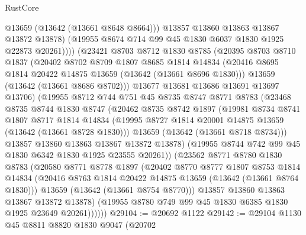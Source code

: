 \begin{lexlean}{RustCore}
\begin{coremodule}
                  @13659
                  (@13642 (@13661 @8648 @8664)))
                @13857
                @13860
                @13863
                @13867
                @13872
                @13878)
              (@19955 @8674 @714 @99 @45 @1830 @6037 @1830 @1925 @22873 @20261))))
        (@23421
          @8703
          @8712
          @1830
          @8785
          (@20395
            @8703
            @8710
            @1837
            (@20402
              @8702
              @8709
              @1807
              @8685
              @1814
              @14834
              (@20416 @8695 @1814 @20422 @14875 @13659 (@13642 (@13661 @8696 @1830)))
              @13659
              (@13642 (@13661 @8686 @8702)))
            @13677
            @13681
            @13686
            @13691
            @13697
            @13706)
          (@19955
            @8712
            @744
            @751
            @45
            @8735
            @8747
            @8771
            @8783
            (@23468
              @8735
              @8744
              @1830
              @8747
              (@20462
                @8735
                @8742
                @1897
                (@19981
                  @8734
                  @8741
                  @1807
                  @8717
                  @1814
                  @14834
                  (@19995 @8727 @1814 @20001 @14875 @13659 (@13642 (@13661 @8728 @1830)))
                  @13659
                  (@13642 (@13661 @8718 @8734)))
                @13857
                @13860
                @13863
                @13867
                @13872
                @13878)
              (@19955 @8744 @742 @99 @45 @1830 @6342 @1830 @1925 @23555 @20261))
            (@23562
              @8771
              @8780
              @1830
              @8783
              (@20580
                @8771
                @8778
                @1897
                (@20402
                  @8770
                  @8777
                  @1807
                  @8753
                  @1814
                  @14834
                  (@20416 @8763 @1814 @20422 @14875 @13659 (@13642 (@13661 @8764 @1830)))
                  @13659
                  (@13642 (@13661 @8754 @8770)))
                @13857
                @13860
                @13863
                @13867
                @13872
                @13878)
              (@19955 @8780 @749 @99 @45 @1830 @6385 @1830 @1925 @23649 @20261))))))
@29104 := @20692 @1122
@29142 := @29104
    @1130
    @45
    @8811
    @8820
    @1830
    @9047
    (@20702

\end{coremodule}
\end{lexlean}
